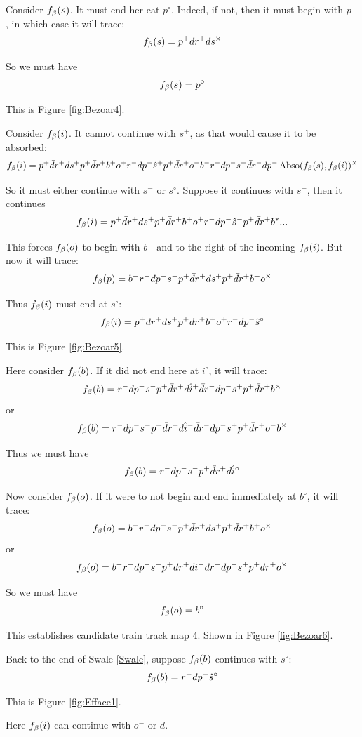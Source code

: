 Consider $f_\beta(s)$. It must end her eat $p^\circ$. Indeed, if not, then it must begin with $p^+$, in which case it will trace:
\[
f_\beta(s) = p^+ \bar{d} r^+ d s^\times
\]

So we must have
\[
f_\beta(s) = p^\circ
\]

This is Figure \ref{fig:Bezoar4}.

Consider $f_\beta(i)$. It cannot continue with $s^+$, as that would cause it to be absorbed:
\[
f_\beta(i) = p^+ \bar{d} r^+ d s^+ p^+ \bar{d} r^+ b^+ o^+ r^- d p^- \hat{s}^+ p^+ \bar{d} r^+ o^- b^- r^- d p^- s^- \bar{d} r^- d p^- \operatorname{Abso}(f_\beta(s), f_\beta(i))^\times
\]

So it must either continue with $s^-$ or $s^\circ$. Suppose it continues with $s^-$, then it continues
\[
f_\beta(i) = p^+ \bar{d} r^+ d s^+ p^+ \bar{d} r^+ b^+ o^+ r^- d p^- \hat{s}^- p^+ \bar{d} r^+ b^*...
\]

This forces $f_\beta(o)$ to begin with $b^-$ and to the right of the incoming $f_\beta(i)$. But now it will trace:
\[
f_\beta(p) = b^- r^- d p^- s^- p^+ \bar{d} r^+ d s^+ p^+ \bar{d} r^+ b^+ o^\times
\]

Thus $f_\beta(i)$ must end at $s^\circ$:
\[
f_\beta(i) = p^+ \bar{d} r^+ d s^+ p^+ \bar{d} r^+ b^+ o^+ r^- d p^- \hat{s}^\circ
\]

This is Figure \ref{fig:Bezoar5}.

Here consider $f_\beta(b)$. If it did not end here at $i^\circ$, it will trace:
\[
f_\beta(b) = r^- d p^- s^- p^+ \bar{d} r^+ d \hat{i}^+ \bar{d} r^- d p^- s^+ p^+ \bar{d} r^+ b^\times
\]
or
\[
f_\beta(b) = r^- d p^- s^- p^+ \bar{d} r^+ d \hat{i}^- \bar{d} r^- d p^- s^+ p^+ \bar{d} r^+ o^- b^\times
\]

Thus we must have
\[
f_\beta(b) = r^- d p^- s^- p^+ \bar{d} r^+ d \hat{i}^\circ
\]

Now consider $f_\beta(o)$. If it were to not begin and end immediately at $b^\circ$, it will trace:
\[
f_\beta(o) = b^- r^- d p^- s^- p^+ \bar{d} r^+ d s^+ p^+ \bar{d} r^+ b^+ o^\times
\]
or
\[
f_\beta(o) = b^- r^- d p^- s^- p^+ \bar{d} r^+ d i^- \bar{d} r^- d p^- s^+ p^+ \bar{d} r^+ o^\times
\]

So we must have
\[
f_\beta(o) = b^\circ
\]

This establishes candidate train track map 4. Shown in Figure \ref{fig:Bezoar6}.


\label{Efface}
Back to the end of Swale \ref{Swale}, suppose $f_\beta(b)$ continues with $s^\circ$:
\[
f_\beta(b) = r^- d p^- \hat{s}^\circ
\]

This is Figure \ref{fig:Efface1}.

Here $f_\beta(i)$ can continue with $o^-$ or $d$.

